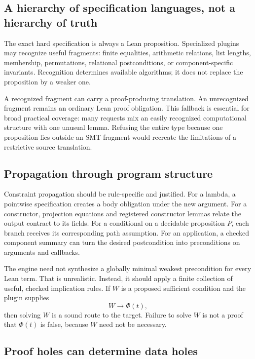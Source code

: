 \documentclass[11pt,letterpaper]{article}
\theoremstyle{definition}
\theoremstyle{remark}
\begin{document}
\subsection{A hierarchy of specification languages, not a hierarchy of truth}

The exact hard specification is always a Lean proposition. Specialized plugins may recognize useful fragments: finite equalities, arithmetic relations, list lengths, membership, permutations, relational postconditions, or component-specific invariants. Recognition determines available algorithms; it does not replace the proposition by a weaker one.

A recognized fragment can carry a proof-producing translation. An unrecognized fragment remains an ordinary Lean proof obligation. This fallback is essential for broad practical coverage: many requests mix an easily recognized computational structure with one unusual lemma. Refusing the entire type because one proposition lies outside an SMT fragment would recreate the limitations of a restrictive source translation.

\subsection{Propagation through program structure}

Constraint propagation should be rule-specific and justified. For a lambda, a pointwise specification creates a body obligation under the new argument. For a constructor, projection equations and registered constructor lemmas relate the output contract to its fields. For a conditional on a decidable proposition $P$, each branch receives its corresponding path assumption. For an application, a checked component summary can turn the desired postcondition into preconditions on arguments and callbacks.

The engine need not synthesize a globally minimal weakest precondition for every Lean term. That is unrealistic. Instead, it should apply a finite collection of useful, checked implication rules. If $W$ is a proposed sufficient condition and the plugin supplies
\[
 W\to\Phi(t),
\]
then solving $W$ is a sound route to the target. Failure to solve $W$ is not a proof that $\Phi(t)$ is false, because $W$ need not be necessary.

\subsection{Proof holes can determine data holes}
\end{document}
